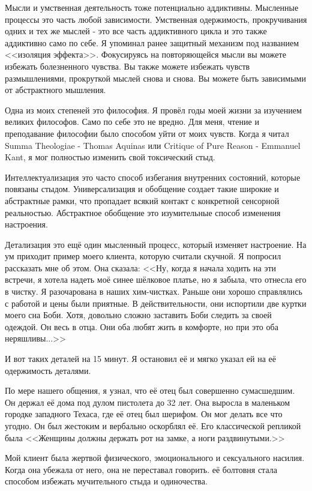 \documentclass[10pt, fleqn]{article}
\begin{document}

Мысли и умственная деятельность тоже потенциально аддиктивны. Мысленные процессы это часть любой зависимости. Умственная одержимость, прокручивания одних и тех же мыслей - это все часть аддиктивного цикла и это также аддиктивно само по себе. Я упоминал ранее защитный механизм под названием <<изоляция эффекта>>. Фокусируясь на повторяющейся мысли вы можете избежать болезненного чувства. Вы также можете избежать чувств размышлениями, прокруткой мыслей снова и снова. Вы можете быть зависимыми от абстрактного мышления.

Одна из моих степеней это философия. Я провёл годы моей жизни за изучением великих философов. Само по себе это не вредно. Для меня, чтение и преподавание философии было способом уйти от моих чувств. Когда я читал Summa Theologiae - Thomas Aquinas или Critique of Pure Reason - Emmanuel Kant, я мог полностью изменить свой токсический стыд.

Интеллектуализация это часто способ избегания внутренних состояний, которые повязаны стыдом. Универсализация и обобщение создает такие широкие и абстрактные рамки, что пропадает всякий контакт с конкретной сенсорной реальностью. Абстрактное обобщение это изумительные способ изменения настроения.


Детализация это ещё один мысленный процесс, который изменяет настроение.
На ум приходит пример моего клиента, которую считали скучной. Я попросил рассказать мне об этом. Она сказала:
<<Ну, когда я начала ходить на эти встречи, я хотела надеть моё синее шёлковое платье, но я забыла, что отнесла его в чистку. Я разочарована в наших хим-чистках. Раньше они хорошо справлялись с работой и цены были приятные. В действительности, они испортили две куртки моего сна Боби. Хотя, довольно сложно заставить Боби следить за своей одеждой. Он весь в отца. Они оба любят жить в комфорте, но при это оба неряшливы...>>

И вот таких деталей на 15 минут. Я остановил её и мягко указал ей на её одержимость деталями.

По мере нашего общения, я узнал, что её отец был совершенно сумасшедшим. Он держал её дома под дулом пистолета до 32 лет. Она выросла в маленьком городке западного Техаса, где её отец был шерифом. Он мог делать все что угодно. Он был жестоким и вербально оскорблял её. Его классической репликой была <<Женщины должны держать рот на замке, а ноги раздвинутыми.>>

Мой клиент была жертвой физического, эмоционального и сексуального насилия. Когда она убежала от него, она не переставал говорить. её болтовня стала способом избежать мучительного стыда и одиночества.
\end{document}
